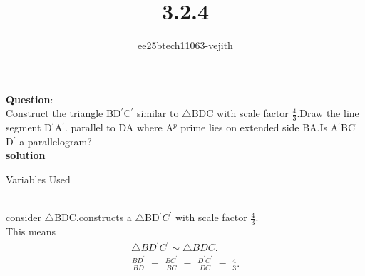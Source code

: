 \documentclass[journal]{IEEEtran}
\begin{document}

\vspace{3cm}

\title{3.2.4}
\author{ee25btech11063-vejith}

\maketitle
{\let\newpage\relax\maketitle}
\renewcommand{\thefigure}{\theenumi}
\renewcommand{\thetable}{\theenumi}
\setlength{\intextsep}{10pt} %
\textbf{Question}:\\
Construct the triangle BD$^{\prime}$C$^{\prime}$ similar to $\triangle$BDC with scale factor $\frac{4}{3}$.Draw the line segment D$^{\prime}$A$^{\prime}$. parallel to DA where A$^p$ prime lies on extended side BA.Is A$^{\prime}$BC$^{\prime}$D$^{\prime}$ a parallelogram?\\ 
\textbf{solution}
\begin{table}[h!]    
  \centering
  
  \caption{Variables Used}
  \label{}
\end{table}\\
consider $\triangle$BDC.constructs a $\triangle$BD$^{\prime}C^{\prime}$
 with scale factor $\frac{4}{3}$.\\
This means 
\begin{align}
  \triangle BD^{\prime}C^{\prime} \sim \triangle BDC.\\
\frac{BD^{\prime}}{BD} \;=\; \frac{BC^{\prime}}{BC} \;=\; \frac{D^{\prime}C^{\prime}}{DC} \;=\; \frac{4}{3}.
\end{align}
\end{document}

